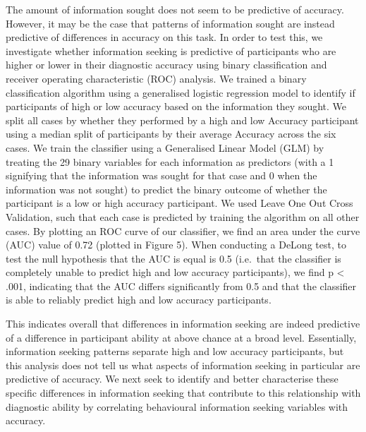 \documentclass[a4paper, nobind]{templates/ociamthesis}
\begin{document}
The amount of information sought does not seem to be predictive of accuracy. However, it may be the case that patterns of information sought are instead predictive of differences in accuracy on this task. In order to test this, we investigate whether information seeking is predictive of participants who are higher or lower in their diagnostic accuracy using binary classification and receiver operating characteristic (ROC) analysis. We trained a binary classification algorithm using a generalised logistic regression model to identify if participants of high or low accuracy based on the information they sought. We split all cases by whether they performed by a high and low Accuracy participant using a median split of participants by their average Accuracy across the six cases. We train the classifier using a Generalised Linear Model (GLM) by treating the 29 binary variables for each information as predictors (with a 1 signifying that the information was sought for that case and 0 when the information was not sought) to predict the binary outcome of whether the participant is a low or high accuracy participant. We used Leave One Out Cross Validation, such that each case is predicted by training the algorithm on all other cases. By plotting an ROC curve of our classifier, we find an area under the curve (AUC) value of 0.72 (plotted in Figure 5). When conducting a DeLong test, to test the null hypothesis that the AUC is equal is 0.5 (i.e.~that the classifier is completely unable to predict high and low accuracy participants), we find p \textless{} .001, indicating that the AUC differs significantly from 0.5 and that the classifier is able to reliably predict high and low accuracy participants.

This indicates overall that differences in information seeking are indeed predictive of a difference in participant ability at above chance at a broad level. Essentially, information seeking patterns separate high and low accuracy participants, but this analysis does not tell us what aspects of information seeking in particular are predictive of accuracy. We next seek to identify and better characterise these specific differences in information seeking that contribute to this relationship with diagnostic ability by correlating behavioural information seeking variables with accuracy.
\end{document}
